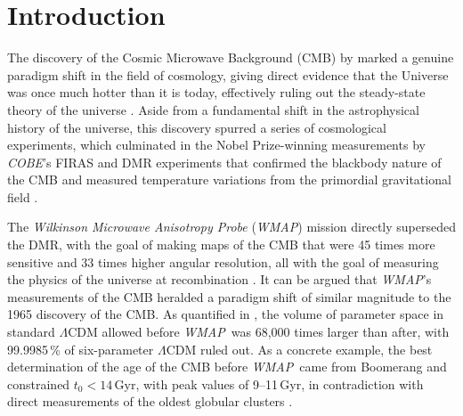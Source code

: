 \documentclass[twocolumn]{../../common/aa}
\def\WMAP{\emph{WMAP}}
\def\COBE{\emph{COBE}}
\begin{document}
\maketitle

\tableofcontents




\section{Introduction}
\label{sec:introduction}


The discovery of the Cosmic Microwave Background (CMB) by \citet{penzias:1965} marked a genuine paradigm shift in the field of cosmology, giving direct evidence that the Universe was once much hotter than it is today, effectively ruling out the steady-state theory of the universe \citep{dicke:1965}. Aside from a fundamental shift in the astrophysical history of the universe, this discovery spurred a series of cosmological experiments, which culminated in the Nobel Prize-winning measurements by \COBE's FIRAS and DMR experiments that confirmed the blackbody nature of the CMB and measured temperature variations from the primordial gravitational field \citep{smoot:1992, mather:1994}.

The \textit{Wilkinson Microwave Anisotropy Probe} (\WMAP) mission directly superseded the DMR, with the goal of making maps of the CMB that were 45 times more sensitive and 33 times higher angular resolution, all with the goal of measuring the physics of the universe at recombination \citep{bennett2003:MAP}. It can be argued that \WMAP's measurements of the CMB heralded a paradigm shift of similar magnitude to the 1965 discovery of the CMB. As quantified in \citet{bennett2012}, the volume of parameter space in standard $\Lambda$CDM allowed before \WMAP\ was 68,000 times larger than after, with 99.9985\,\% of six-parameter $\Lambda$CDM ruled out. As a concrete example, the best determination of the age of the CMB before \WMAP\ came from Boomerang \citep{lange:2001} and constrained $t_0<14\,\mathrm{Gyr}$, with peak values of 9--11\,Gyr, in contradiction with direct measurements of the oldest globular clusters \citep{hu:2001}.
\end{document}
